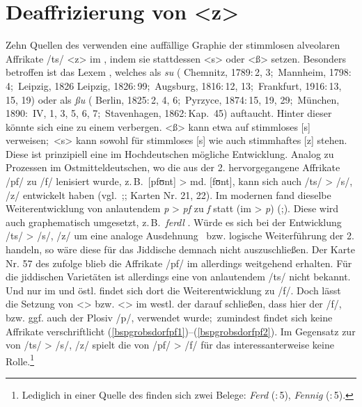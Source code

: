 {\section{Deaffrizierung von <z>}\label{sz}
Zehn Quellen des  verwenden eine auffällige Graphie der stimmlosen alveolaren Affrikate /ts/ <z> im , indem sie stattdessen <s> oder <ß> setzen. Besonders betroffen ist das Lexem , welches als \textit{su} ( Chemnitz, 1789:\,2, 3;\,  Mannheim, 1798:\,4;\,  Leipzig, 1826 Leipzig, 1826:\,99;\,  Augsburg, 1816:\,12, 13;\,  Frankfurt, 1916:\,13, 15, 19) oder als \textit{ßu} ( Berlin, 1825:\,2, 4, 6;\,  Pyrzyce, 1874:\,15, 19, 29;\,  München, 1890:\, IV, 1, 3, 5, 6, 7;\,  Stavenhagen, 1862:\,Kap.\, 45) auftaucht. Hinter dieser  könnte sich eine  zu einem  verbergen. <ß> kann etwa auf stimmloses [s] verweisen;\, <s> kann sowohl für stimmloses [s] wie auch stimmhaftes [z] stehen. Diese  ist prinzipiell eine im Hochdeutschen mögliche Entwicklung. Analog zu Prozessen im Ostmitteldeutschen, wo die aus der 2.  hervorgegangene Affrikate /pf/ zu /f/ lenisiert wurde, z.\,B.\, [pfʊnt] > md. [fʊnt], kann sich auch /ts/ > /s/, /z/ entwickelt haben (vgl.\, \citealt[273, 282]{Schirmunski1962};\citealt[64f]{Koenig1978}; Karten Nr. 21, 22). Im modernen \hai{{\OJ}} fand dieselbe Weiterentwicklung von anlautendem {\germ} \textit{p} > {\mhd} \textit{pf} zu \textit{f} statt (im  > \textit{p}) (\citealt[189]{Kleine2008};\citealt[323–327]{Bin-Nun1973}). Diese wird auch graphematisch umgesetzt, z.\,B.\,  %
\textit{ferdl} . Würde es sich bei der Entwicklung /ts/ > /s/, /z/ um eine analoge Ausdehnung \,%
bzw. logische Weiterführung der 2.  handeln, so wäre diese für das Jiddische demnach nicht auszuschließen. Der Karte Nr. 57 des  zufolge blieb die Affrikate /pf/ im \hai{{\WJ}} allerdings weitgehend erhalten.  Für die jiddischen Varietäten ist allerdings eine  von anlautendem /ts/ nicht bekannt. Und nur im \hai{{\NWJ}} und östl.  findet sich dort die Weiterentwicklung zu /f/. Doch lässt die Setzung von <> %
bzw. <> im westl.  der  darauf schließen, dass hier der  /f/, bzw. ggf. auch der Plosiv /p/, verwendet wurde;\, zumindest findet sich keine Affrikate verschriftlicht (\ref{bspgrobsdorfpf1})--(\ref{bspgrobsdorfpf2}). Im Gegensatz zur  von /ts/ > /s/, /z/ spielt die von /pf/ > /f/ für das \hai{{\LiJi}} interessanterweise keine Rolle.\footnote{Lediglich in einer Quelle des  finden sich zwei Belege: \textit{Ferd}  (:\,5), \textit{Fennig}  (:\,5).} 


}
